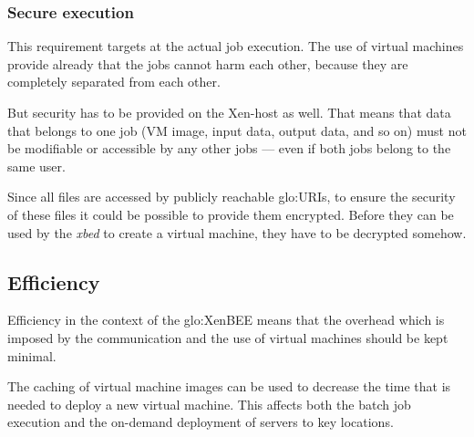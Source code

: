 \subsubsection{Secure execution}

This requirement targets at the  actual job execution.  The use of virtual
machines provide  already that  the jobs cannot  harm each  other, because
they are completely separated from each other.

But security has  to be provided on the Xen-host as  well. That means that
data that  belongs to one job (VM  image, input data, output  data, and so
on) must  not be modifiable  or accessible by  any other jobs ---  even if
both jobs belong to the same user.

Since  all files  are accessed  by publicly  reachable  \gls{glo:URI}s, to
ensure the  security of these files  it could be possible  to provide them
encrypted. Before they can be used  by the \emph{xbed} to create a virtual
machine, they have to be decrypted somehow.

\subsection{Efficiency}

Efficiency in the context of  the \gls{glo:XenBEE} means that the overhead
which  is imposed by  the communication  and the  use of  virtual machines
should be kept minimal.

The caching  of virtual machine  images can be  used to decrease  the time
that is  needed to  deploy a  new virtual machine.  This affects  both the
batch  job  execution and  the  on-demand  deployment  of servers  to  key
locations.




